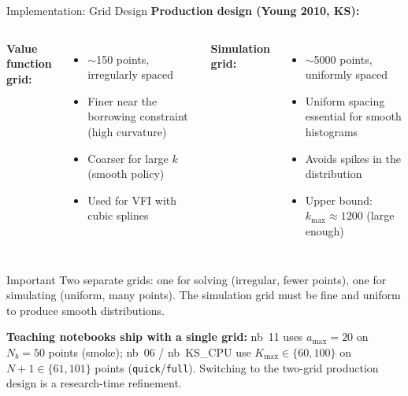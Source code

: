 \documentclass[aspectratio=169,11pt]{beamer}
\newcommand{\emphc}[1]{\textcolor{harvardcrimson}{#1}}
\begin{document}
\begin{frame}[shrink=24]{Implementation: Grid Design}
\textbf{Production design (Young 2010, KS):}

\vspace{0.5em}
\begin{columns}[T]
\textbf{Value function grid:}
\begin{itemize}
    \item $\sim$150 points, \emphc{irregularly spaced}
    \item Finer near the borrowing constraint (high curvature)
    \item Coarser for large $k$ (smooth policy)
    \item Used for VFI with cubic splines
\end{itemize}

\textbf{Simulation grid:}
\begin{itemize}
    \item $\sim$5000 points, \emphc{uniformly spaced}
    \item Uniform spacing essential for smooth histograms
    \item Avoids spikes in the distribution
    \item Upper bound: $k_{\max} \approx 1200$ (large enough)
\end{itemize}
\end{columns}

\vspace{0.5em}
\begin{alertblock}{Important}
\emphc{Two separate grids}: one for solving (irregular, fewer points), one for simulating (uniform, many points). The simulation grid must be fine and uniform to produce smooth distributions.
\end{alertblock}

\vspace{0.3em}
{\footnotesize \textbf{Teaching notebooks ship with a single grid:} nb~11 uses $a_{\max}=20$ on $N_b=50$ points (smoke); nb~06 / nb~KS\_CPU use $K_{\max}\in\{60,100\}$ on $N+1\in\{61,101\}$ points (\texttt{quick}/\texttt{full}).  Switching to the two-grid production design is a research-time refinement.}
\end{frame}
\end{document}

